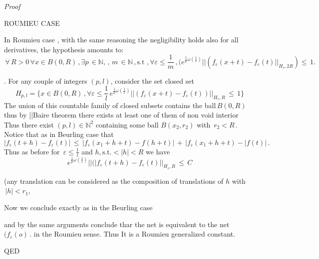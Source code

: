 \documentclass[10pt,a4paper]{amsart}
\newcommand{\NN}{\mathbb N}
\newenvironment{proof}{\emph{Proof} }{QED}
\begin{document}
\begin{proof}
 



ROUMIEU CASE


In Roumieu case  , with the same reasoning the negligibility holds also for all derivatives, the hypothesis amounts to:
$$\,\forall\, R>0 \,\forall x \in B(0,R)\,,\exists p\,\in \NN,  \,,\,m\,\in \NN\,,
\mbox{s.t}\,
\,,\forall \varepsilon\leq \frac{1}{m}\,,
(e^{\frac{1}{p}\omega(\frac{1}{\varepsilon})}
||(f_\varepsilon(x+t)-f_\varepsilon (t) ||_{H_s,2R})\leq\,1.$$


.
For any couple of integers $(p,l)$, consider the set closed  set 
$$H_{p,l}= \{x\in B(0,R)\,,\forall\varepsilon \leq \frac{1}{l}\,e^{\frac{1}{p}\omega(\frac{1}{\varepsilon})}
||(f_\varepsilon(x+t)-f_\varepsilon (t))||_{H_s,R}\,\leq\,1\}$$
The union of this countable family of closed  subsets  contains the ball$\,B(0,R)\,$
thus by ||Baire theorem there exists at least one of them of non void interior 
Thus there exist $(p,l) \in \NN^2$ containing some ball
$B(x_2, r_2)$ with $\,r_2<R\,.$  Notice that  as in Beurling case that  
$$|f_\varepsilon (t+h)-f_\varepsilon(t)|\,\leq\,
|f_\varepsilon(x_1+h+t)-f(h+t)|
\,+\,|f_\varepsilon (x_1+h+t)-|f(t)|\,.$$
Thus as before 
for $\,\varepsilon\leq \frac{1}{l}$ and $h, \mbox{s.t.} <|h|<R$
we have $$
e^{\frac{1}{p}\omega(\frac{1}{\varepsilon})}||(|f_\varepsilon (t+h)-f_\varepsilon(t)||_{H_s,R}\,\leq\,C  $$

 (any translation can be considered as the composition of translations of $h$ with $\,|h|<r_1,$

Now we conclude exactly as in the Beurling case 

 and by the same arguments  conclude thar the net is equivalent to the net $(f_\varepsilon(o)\,.$ in the Roumieu sense.
Thus It is a Roumieu  generalized constant.

\end{proof}
\end{document}
